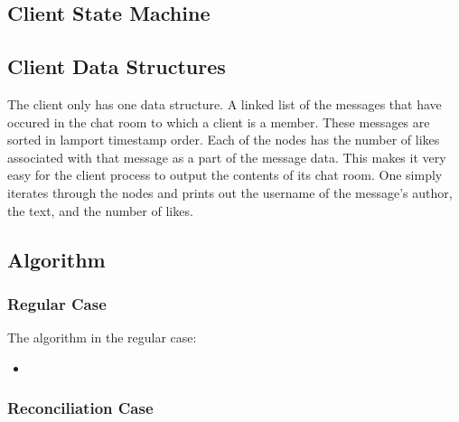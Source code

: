 \documentclass[12pt,journal,compsoc]{IEEEtran}
\begin{document}
\subsection{Client State Machine}

\subsection{Client Data Structures}
The client only has one data structure. A linked list of the messages that have occured in the chat room to which a client is a member. These messages are sorted in lamport timestamp order. Each of the nodes has the number of likes associated with that message as a part of the message data. This makes it very easy for the client process to output the contents of its chat room. One simply iterates through the nodes and prints out the username of the message's author, the text, and the number of likes.

\subsection{Algorithm}

\subsubsection{Regular Case}

The algorithm in the regular case:
\begin{itemize}
\item 
\end{itemize}

\subsubsection{Reconciliation Case}
\end{document}
